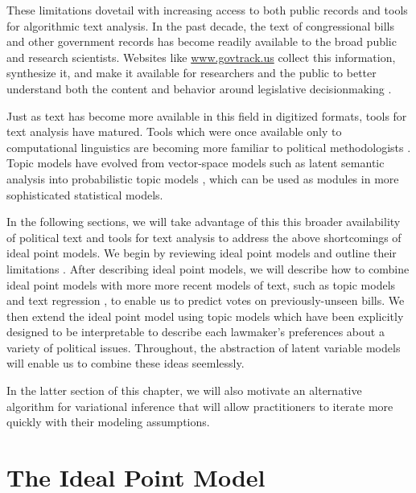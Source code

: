 These limitations dovetail with increasing access to both public
records and tools for algorithmic text analysis.  In the past decade,
the text of congressional bills and other government records has become
readily available to the broad public and research scientists.
Websites like \url{www.govtrack.us} collect this
information, synthesize it, and make it available for researchers and
the public to better understand both the content and behavior around
legislative decisionmaking  \citep{govtrack:2009}.

Just as text has become more available in this field in digitized
formats, tools for text analysis have matured.  Tools which were once
available only to computational linguistics are becoming more familiar
to political methodologists \citep{zimmer:2012}.  Topic models have
evolved from vector-space models such as latent semantic analysis
\citep{deerwester:1990} into probabilistic topic models
\citep{hofmann:1999,blei:2003}, which can be used as modules in more
sophisticated statistical models.

In the following sections, we will take advantage of this this broader
availability of political text and tools for text analysis to address
the above shortcomings of ideal point models.  We begin by reviewing
ideal point models and outline their limitations
\citep{poole:1985,poole:1991,jackman:2001,martin:2002,clinton:2004}.
After describing ideal point models, we will describe how to combine
ideal point models with more more recent models of text, such as topic
models \citep{blei:2003} and text regression \citep{kogan:2009}, to
enable us to predict votes on previously-unseen bills. We then extend
the ideal point model using topic models which have been explicitly
designed to be interpretable \citep{ramage:2009} to describe each
lawmaker's preferences about a variety of political issues.
Throughout, the abstraction of latent variable models will enable us to
combine these ideas seemlessly.

In the latter section of this chapter, we will also motivate an
alternative algorithm for variational inference that will allow
practitioners to iterate more quickly with their modeling assumptions.

\section{The Ideal Point Model}
\label{sec:model}

